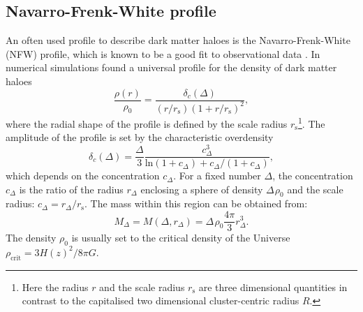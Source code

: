 \documentclass[useAMS,usenatbib]{mnras}
\begin{document}
\subsection{Navarro-Frenk-White profile}
\label{sec:nfw}

An often used profile to describe dark matter haloes is the Navarro-Frenk-White (NFW) profile, which is known to be a good fit to observational data \citep[e.g.][]{okabe13, umetsu14, viola15}. In numerical simulations \citet{navarro97} found a universal profile for the density of dark matter haloes
\begin{equation}
 \frac{\rho (r)}{\rho_0} = \frac{\delta_c(\Delta)}{(r/r_\mathrm{s}) (1+r/r_\mathrm{s})^2} ,
 \label{eq:nfw}
\end{equation}
where the radial shape of the profile is defined by the scale radius  $r_\mathrm{s}$\footnote{Here the radius $r$ and the scale radius $r_\mathrm{s}$ are three dimensional quantities in contrast to the capitalised two dimensional cluster-centric radius $R$.}. The amplitude of the profile is set by the characteristic overdensity 
\begin{equation}
\delta_c(\Delta) = \dfrac{\Delta}{3} \dfrac{c_\Delta^3}{\mathrm{ln}(1+c_\Delta) +c_\Delta/(1+c_\Delta)} , 
 \label{eq:deltaconc}
\end{equation}
which depends on the concentration $c_\Delta$. For a fixed number $\Delta$, the concentration $c_\Delta$ is the ratio of the radius $r_\Delta$ enclosing a sphere of density $\Delta \hspace{1pt} \rho_0$ and the scale radius: $c_\Delta = r_\Delta/r_\mathrm{s}$. The mass within this region can be obtained from:
\begin{equation}
 M_\Delta = M(\Delta, r_\Delta) = \Delta \hspace{1pt} \rho_0  \frac{4 \pi}{3} r_\Delta^3 .
 \label{eq:nfwmass}
\end{equation}
The density $\rho_0$ is usually set to the critical density of the Universe $\rho_\mathrm{crit} = 3 H(z)^2/8 \pi G$.
\end{document}
